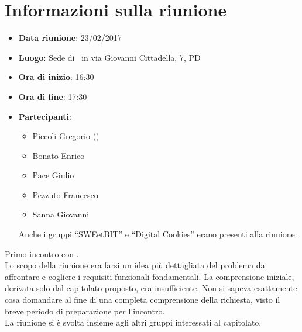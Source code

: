 \documentclass[../AnalisiDeiRequisiti.tex]{subfiles}
\begin{document}
	\section*{Informazioni sulla riunione}
		\begin{itemize}
			\item \textbf{Data riunione}: 23/02/2017
			\item \textbf{Luogo}: Sede di \proponente\ in via Giovanni Cittadella, 7, PD
			\item \textbf{Ora di inizio}: 16:30
			\item \textbf{Ora di fine}: 17:30
			\item \textbf{Partecipanti}:
				\begin{itemize}
					\item Piccoli Gregorio (\proponente)
					\item Bonato Enrico
					\item Pace Giulio
					\item Pezzuto Francesco
					\item Sanna Giovanni
				\end{itemize}
				Anche i gruppi ``SWEetBIT'' e ``Digital Cookies'' erano presenti alla riunione.
		\end{itemize}
		Primo incontro con \proponente.\\
		Lo scopo della riunione era farsi un idea più dettagliata del problema da affrontare e
		cogliere i requisiti funzionali fondamentali. La comprensione iniziale, derivata solo
		dal capitolato proposto, era insufficiente. Non si sapeva esattamente cosa domandare al
		fine di una completa comprensione della richiesta, visto il breve periodo di
		preparazione per l'incontro.\\
		La riunione si è svolta insieme agli altri gruppi interessati al capitolato.
\end{document}

